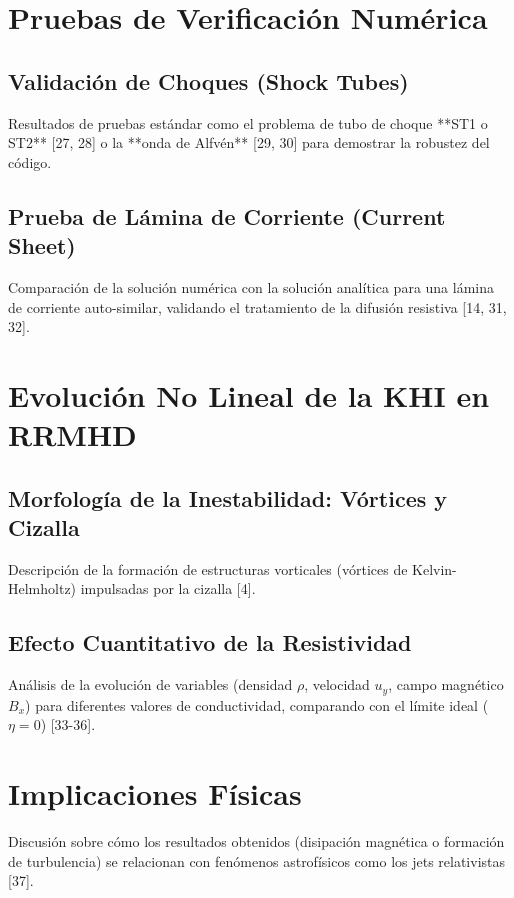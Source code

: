 \section{Pruebas de Verificación Numérica}
    \subsection{Validación de Choques (Shock Tubes)}
        Resultados de pruebas estándar como el problema de tubo de choque **ST1 o ST2** [27, 28] o la **onda de Alfvén** [29, 30] para demostrar la robustez del código.
    \subsection{Prueba de Lámina de Corriente (Current Sheet)}
        Comparación de la solución numérica con la solución analítica para una lámina de corriente auto-similar, validando el tratamiento de la difusión resistiva [14, 31, 32].

\section{Evolución No Lineal de la KHI en RRMHD}
    \subsection{Morfología de la Inestabilidad: Vórtices y Cizalla}
        Descripción de la formación de estructuras vorticales (vórtices de Kelvin-Helmholtz) impulsadas por la cizalla [4].
    \subsection{Efecto Cuantitativo de la Resistividad}
        Análisis de la evolución de variables (densidad $\rho$, velocidad $u_y$, campo magnético $B_x$) para diferentes valores de conductividad, comparando con el límite ideal ($\eta=0$) [33-36].

\section{Implicaciones Físicas}
    Discusión sobre cómo los resultados obtenidos (disipación magnética o formación de turbulencia) se relacionan con fenómenos astrofísicos como los jets relativistas [37].
